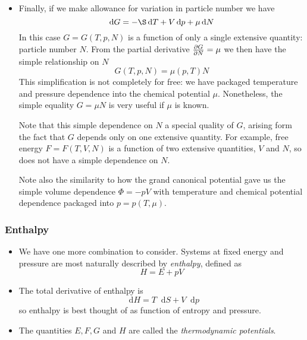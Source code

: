 \documentclass[11pt, a4paper]{article}
\newcommand{\diff}{\mathop{}\!\mathrm{d}} %
\begin{document}
\begin{itemize}
	\item Finally, if we make allowance for variation in particle number we have
	\begin{equation*}
		\diff G = - \S \diff T + V \diff p + \mu \diff N
	\end{equation*}
	In this case $ G = G(T, p, N) $ is a function of only a single extensive quantity: particle number $ N $. From the partial derivative $ \pdv{G}{N} = \mu $ we then have the simple relationship on $ N $
	\begin{equation*}
		G(T, p, N) = \mu(p, T) N
	\end{equation*}
	This simplification is not completely for free: we have packaged temperature and pressure dependence into the chemical potential $ \mu $. Nonetheless, the simple equality $ G = \mu N $ is very useful if $ \mu $ is known.
	
	Note that this simple dependence on $ N $ a special quality of $ G $, arising form the fact that $ G $ depends only on one extensive quantity. For example, free energy $ F = F(T, V, N) $ is a function of two extensive quantities, $ V $ and $ N $, so does not have a simple dependence on $ N $.
	
	Note also the similarity to how the grand canonical potential gave us the simple volume dependence $ \Phi = - pV $ with temperature and chemical potential dependence packaged into $ p = p(T, \mu) $. 
	
\end{itemize}
	
\subsubsection{Enthalpy}
\begin{itemize}
	\item We have one more combination to consider. Systems at fixed energy and pressure are most naturally described by \textit{enthalpy}, defined as
	\begin{equation*}
		H = E + p V
	\end{equation*}
	
	\item The total derivative of enthalpy is 
	\begin{equation*}
		\diff H = T \diff S + V \diff p
	\end{equation*}
	so enthalpy is best thought of as function of entropy and pressure.
	
	\item The quantities $ E, F, G $ and $ H $ are called the \textit{thermodynamic potentials}.
\end{itemize}
\end{document}
